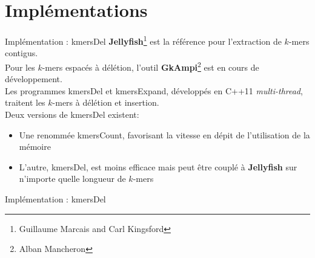 \documentclass[11pt]{beamer}
\begin{document}
\section{Implémentations}
\begin{frame}[fragile]{Implémentation : kmersDel}
  \textbf{Jellyfish}\footnote{Guillaume Marcais and Carl Kingsford\cite{Marcais2011}} est la référence pour l'extraction de $k$-mers contigus.\medskip\\\pause
  Pour les $k$-mers espacés à délétion, l'outil \textbf{GkAmpi}\footnote{Alban Mancheron\cite{Mancheron}} est en cours de développement.\medskip\\\pause
  Les programmes kmersDel et kmersExpand, développés en C++11 \textit{multi-thread}, traitent les $k$-mers à délétion et insertion.\medskip\\\pause
  Deux versions de kmersDel existent:\pause
  \begin{itemize}[<+-| alert@+>]
    \item Une renommée kmersCount, favorisant la vitesse en dépit de l'utilisation de la mémoire
    \item L'autre, kmersDel, est moins efficace mais peut être couplé à \textbf{Jellyfish} sur n'importe quelle longueur de $k$-mers
  \end{itemize}\bigskip
\end{frame}

\begin{frame}[fragile]{Implémentation : kmersDel}
  \scriptsize
  \begin{algorithm}[H]{
    \pause
  }\end{algorithm}
  \normalsize
\end{frame}
\end{document}
